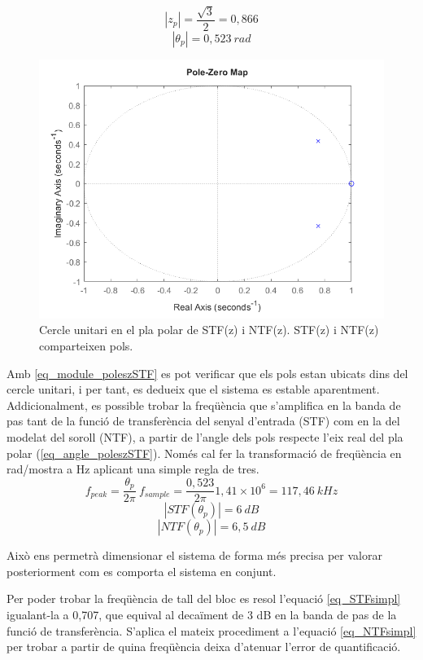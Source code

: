 \begin{equation}\label{eq_module_poleszSTF}
    \left|z_p\right| = \frac{\sqrt{3}}{2} = 0,866
\end{equation}
\begin{equation}\label{eq_angle_poleszSTF}
    \left|\theta_p\right| = 0,523\ rad
\end{equation}
\begin{figure}[H]
    \centering
    \includegraphics[width=0.5\linewidth]{Images/zeropoleMapMOD2.png}
    \caption{Cercle unitari en el pla polar de STF(z) i NTF(z). STF(z) i NTF(z) comparteixen pols.}
    \label{figzeropoleMap}
\end{figure}
\par Amb \ref{eq_module_poleszSTF} es pot verificar que els pols estan ubicats dins del cercle unitari, i per tant, es dedueix que el sistema es estable aparentment. Addicionalment, es possible trobar la freqüència que s'amplifica en la banda de pas tant de la funció de transferència del senyal d'entrada (STF) com en la del modelat del soroll (NTF), a partir de l'angle dels pols respecte l'eix real del pla polar (\ref{eq_angle_poleszSTF}). Només cal fer la transformació de freqüència en rad/mostra a Hz aplicant una simple regla de tres.
\begin{equation}\label{eq_cornerfreq}
    f_{peak} = \frac{\theta_{p}}{2\pi}\ f_{sample} = \frac{0,523}{2\pi}1,41\times 10^6 = 117,46\ kHz
\end{equation}
\begin{equation}\label{eq_magn_wnSTF}
    \left| STF(\theta_p)\right| = 6\ dB
\end{equation}
\begin{equation}\label{eq_magn_wnNTF}
    \left| NTF(\theta_p)\right| = 6,5\ dB
\end{equation}
\par Això ens permetrà dimensionar el sistema de forma més precisa per valorar posteriorment com es comporta el sistema en conjunt.
\par Per poder trobar la freqüència de tall del bloc es resol l'equació \ref{eq_STFsimpl} igualant-la a 0,707, que equival al decaïment de 3 dB en la banda de pas de la funció de transferència. S'aplica el mateix procediment a l'equació \ref{eq_NTFsimpl} per trobar a partir de quina freqüència deixa d'atenuar l'error de quantificació. 
